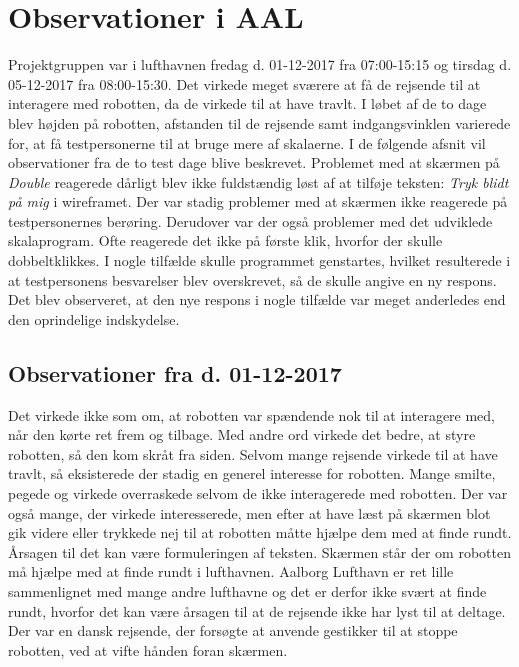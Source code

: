 \section{Observationer i AAL}
\label{TestAfSkalaLufthavnsBesog}
%
Projektgruppen var i lufthavnen fredag d. 01-12-2017 fra 07:00-15:15 og tirsdag d. 05-12-2017 fra 08:00-15:30. Det virkede meget sværere at få de rejsende til at interagere med robotten, da de virkede til at have travlt. I løbet af de to dage blev højden på robotten, afstanden til de rejsende samt indgangsvinklen varierede for, at få testpersonerne til at bruge mere af skalaerne. I de følgende afsnit vil observationer fra de to test dage blive beskrevet.\blankline
%
Problemet med at skærmen på \textit{Double} reagerede dårligt blev ikke fuldstændig løst af at tilføje teksten: \textit{Tryk blidt på mig} i wireframet. Der var stadig problemer med at skærmen ikke reagerede på testpersonernes berøring. Derudover var der også problemer med det udviklede skalaprogram. Ofte reagerede det ikke på første klik, hvorfor der skulle dobbeltklikkes. I nogle tilfælde skulle programmet genstartes, hvilket resulterede i at testpersonens besvarelser blev overskrevet, så de skulle angive en ny respons. Det blev observeret, at den nye respons i nogle tilfælde var meget anderledes end den oprindelige indskydelse.

\subsection{Observationer fra d. 01-12-2017}
Det virkede ikke som om, at robotten var spændende nok til at interagere med, når den kørte ret frem og tilbage. Med andre ord virkede det bedre, at styre robotten, så den kom skråt fra siden. Selvom mange rejsende virkede til at have travlt, så eksisterede der stadig en generel interesse for robotten. Mange smilte, pegede og virkede overraskede selvom de ikke interagerede med robotten. Der var også mange, der virkede interesserede, men efter at have læst på skærmen blot gik videre eller trykkede nej til at robotten måtte hjælpe dem med at finde rundt. Årsagen til det kan være formuleringen af teksten. Skærmen står der om robotten må hjælpe med at finde rundt i lufthavnen. Aalborg Lufthavn er ret lille sammenlignet med mange andre lufthavne og det er derfor ikke svært at finde rundt, hvorfor det kan være årsagen til at de rejsende ikke har lyst til at deltage. Der var en dansk rejsende, der forsøgte at anvende gestikker til at stoppe robotten, ved at vifte hånden foran skærmen.

